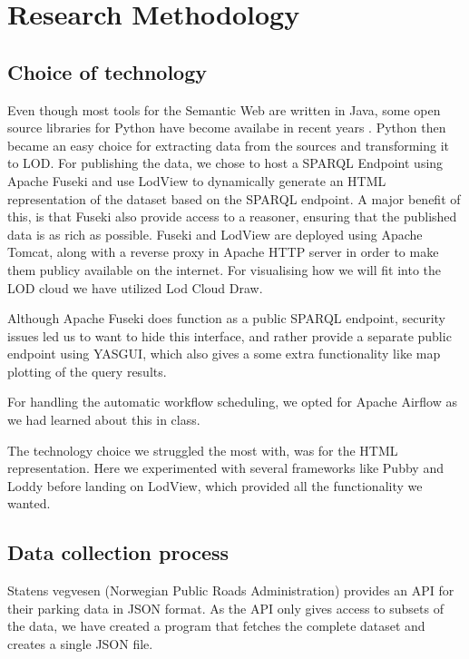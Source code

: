 \chapter{Research Methodology}

\section{Choice of technology}
Even though most tools for the Semantic Web are written in Java, some open source libraries for Python have become availabe in recent years \cite{w3java}. Python then became an easy choice for extracting data from the sources and transforming it to LOD. For publishing the data, we chose to host a SPARQL Endpoint using Apache Fuseki and use LodView to dynamically generate an HTML representation of the dataset based on the SPARQL endpoint. A major benefit of this, is that Fuseki also provide access to a reasoner, ensuring that the published data is as rich as possible. Fuseki and LodView are deployed using Apache Tomcat, along with a reverse proxy in Apache HTTP server in order to make them publicy available on the internet. For visualising how we will fit into the LOD cloud we have utilized Lod Cloud Draw.

\vspace{5mm}

Although Apache Fuseki does function as a public SPARQL endpoint, security issues led us to want to hide this interface, and rather provide a separate public endpoint using YASGUI, which also gives a some extra functionality like map plotting of the query results.

\vspace{5mm}

For handling the automatic workflow scheduling, we opted for Apache Airflow as we had learned about this in class.

\vspace{5mm}

The technology choice we struggled the most with, was for the HTML representation. Here we experimented with several frameworks like Pubby and Loddy before landing on LodView, which provided all the functionality we wanted.

\section{Data collection process}
Statens vegvesen (Norwegian Public Roads Administration) \cite{statensvegvesen} provides an API for their parking data in JSON format. As the API only gives access to subsets of the data, we have created a program that fetches the complete dataset and creates a single JSON file.

